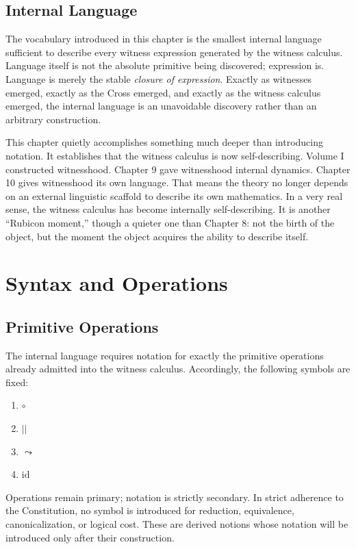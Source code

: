 \documentclass[12pt,anyside]{book}
\begin{document}
\subsection{Internal Language}
The vocabulary introduced in this chapter is the smallest internal language sufficient to describe every witness expression generated by the witness calculus. Language itself is not the absolute primitive being discovered; expression is. Language is merely the stable \textit{closure of expression}. Exactly as witnesses emerged, exactly as the Cross emerged, and exactly as the witness calculus emerged, the internal language is an unavoidable discovery rather than an arbitrary construction.

This chapter quietly accomplishes something much deeper than introducing notation. It establishes that the witness calculus is now self-describing. Volume I constructed witnesshood. Chapter 9 gave witnesshood internal dynamics. Chapter 10 gives witnesshood its own language. That means the theory no longer depends on an external linguistic scaffold to describe its own mathematics. In a very real sense, the witness calculus has become internally self-describing. It is another ``Rubicon moment,'' though a quieter one than Chapter 8: not the birth of the object, but the moment the object acquires the ability to describe itself.

\section{Syntax and Operations}

\subsection{Primitive Operations}
The internal language requires notation for exactly the primitive operations already admitted into the witness calculus. Accordingly, the following symbols are fixed:
\begin{enumerate}
    \item $\circ$
    \item $||$
    \item $\leadsto$
    \item $\mathrm{id}$
\end{enumerate}

Operations remain primary; notation is strictly secondary. In strict adherence to the Constitution, no symbol is introduced for reduction, equivalence, canonicalization, or logical cost. These are derived notions whose notation will be introduced only after their construction.
\end{document}
